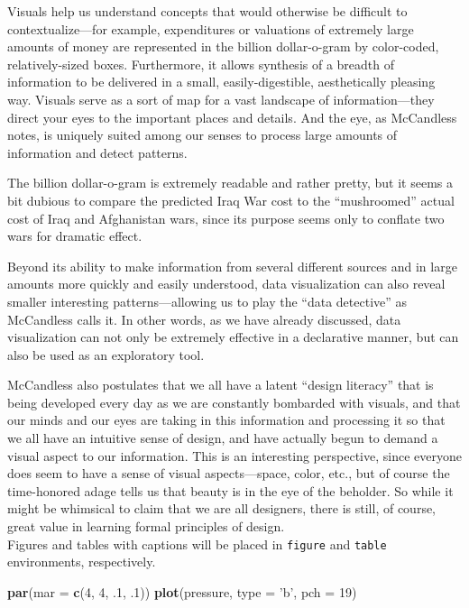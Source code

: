 \documentclass[]{book}
\newenvironment{Shaded}{\begin{snugshade}}{\end{snugshade}}
\newcommand{\KeywordTok}[1]{\textcolor[rgb]{0.13,0.29,0.53}{\textbf{#1}}}
\newcommand{\DataTypeTok}[1]{\textcolor[rgb]{0.13,0.29,0.53}{#1}}
\newcommand{\DecValTok}[1]{\textcolor[rgb]{0.00,0.00,0.81}{#1}}
\newcommand{\StringTok}[1]{\textcolor[rgb]{0.31,0.60,0.02}{#1}}
\newcommand{\NormalTok}[1]{#1}
\theoremstyle{definition}
\theoremstyle{definition}
\theoremstyle{definition}
\theoremstyle{remark}
\begin{document}
Visuals help us understand concepts that would otherwise be difficult to
contextualize---for example, expenditures or valuations of extremely
large amounts of money are represented in the billion dollar-o-gram by
color-coded, relatively-sized boxes. Furthermore, it allows synthesis of
a breadth of information to be delivered in a small, easily-digestible,
aesthetically pleasing way. Visuals serve as a sort of map for a vast
landscape of information---they direct your eyes to the important places
and details. And the eye, as McCandless notes, is uniquely suited among
our senses to process large amounts of information and detect patterns.

The billion dollar-o-gram is extremely readable and rather pretty, but
it seems a bit dubious to compare the predicted Iraq War cost to the
``mushroomed'' actual cost of Iraq and Afghanistan wars, since its
purpose seems only to conflate two wars for dramatic effect.

Beyond its ability to make information from several different sources
and in large amounts more quickly and easily understood, data
visualization can also reveal smaller interesting patterns---allowing us
to play the ``data detective'' as McCandless calls it. In other words,
as we have already discussed, data visualization can not only be
extremely effective in a declarative manner, but can also be used as an
exploratory tool.

McCandless also postulates that we all have a latent ``design literacy''
that is being developed every day as we are constantly bombarded with
visuals, and that our minds and our eyes are taking in this information
and processing it so that we all have an intuitive sense of design, and
have actually begun to demand a visual aspect to our information. This
is an interesting perspective, since everyone does seem to have a sense
of visual aspects---space, color, etc., but of course the time-honored
adage tells us that beauty is in the eye of the beholder. So while it
might be whimsical to claim that we are all designers, there is still,
of course, great value in learning formal principles of design.\\
Figures and tables with captions will be placed in \texttt{figure} and
\texttt{table} environments, respectively.

\begin{Shaded}
\begin{Highlighting}[]
\KeywordTok{par}\NormalTok{(}\DataTypeTok{mar =} \KeywordTok{c}\NormalTok{(}\DecValTok{4}\NormalTok{, }\DecValTok{4}\NormalTok{, .}\DecValTok{1}\NormalTok{, .}\DecValTok{1}\NormalTok{))}
\KeywordTok{plot}\NormalTok{(pressure, }\DataTypeTok{type =} \StringTok{'b'}\NormalTok{, }\DataTypeTok{pch =} \DecValTok{19}\NormalTok{)}
\end{Highlighting}
\end{Shaded}
\end{document}
